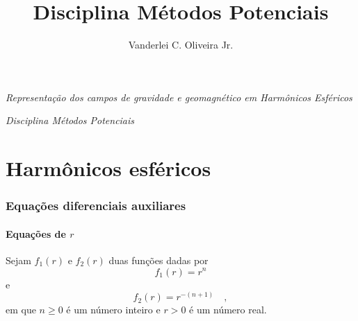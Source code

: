 \documentclass[10pt,a4paper,fleqn]{article}
\title{Disciplina M\'{e}todos Potenciais}
\author{Vanderlei C. Oliveira Jr.}
\date{}
\begin{document}
\begin{center}

\begin{huge}
\emph{Representação dos campos de gravidade e geomagnético em Harmônicos Esféricos}
\end{huge}

\bigskip
\bigskip

\begin{large}
\emph{Disciplina M\'{e}todos Potenciais}
\end{large}

\end{center}

\bigskip
\bigskip

\begin{center}


\end{center}

\clearpage

\tableofcontents

\clearpage

\part{Harm\^{o}nicos esf\'{e}ricos}

\section{Equa\c{c}\~{o}es diferenciais auxiliares}

\subsection{Equa\c{c}\~{o}es de $r$}

Sejam $f_{1}(r)$ e $f_{2}(r)$ duas fun\c{c}\~{o}es dadas por
\begin{equation}
f_{1}(r) = r^{n}
\label{eq:ex211-r^}
\end{equation}
e
\begin{equation}
f_{2}(r) = r^{-(n+1)} \quad ,
\label{eq:ex211-r_}
\end{equation}
em que $n \geqslant 0$ \'{e} um n\'{u}mero inteiro e $r > 0$ \'{e} um n\'{u}mero real. 
\end{document}
